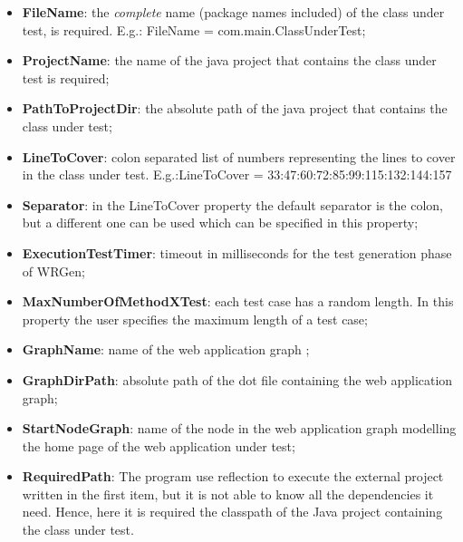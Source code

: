 \begin{itemize}
	\item \textbf{FileName}: the \textit{complete} name (package names included) of the class under test, is required.	E.g.: FileName = com.main.ClassUnderTest;
	\item \textbf{ProjectName}: the name of the java project that contains the class under test is required;
	\item \textbf{PathToProjectDir}: the absolute path of the java project that contains the class under test;
	\item \textbf{LineToCover}: colon separated list of numbers representing the lines to cover in the class under test. E.g.:LineToCover = 33:47:60:72:85:99:115:132:144:157
	\item \textbf{Separator}: in the LineToCover property the default separator is the colon, but a different one can be used which can be specified in this property;
	\item \textbf{ExecutionTestTimer}: timeout in milliseconds for the test generation phase of WRGen;
	\item \textbf{MaxNumberOfMethodXTest}: each test case has a random length. In this property the user specifies the maximum length of a test case;
	\item \textbf{GraphName}: name of the web application graph ;
	\item \textbf{GraphDirPath}: absolute path of the dot file containing the web application graph;
	\item \textbf{StartNodeGraph}: name of the node in the web application graph modelling the home page of the web application under test;
	\item \textbf{RequiredPath}: The program use reflection to execute the external project written in the first item, but it is not able to know all the dependencies it need. Hence, here it is required the classpath of the Java project containing the class under test.
\end{itemize}